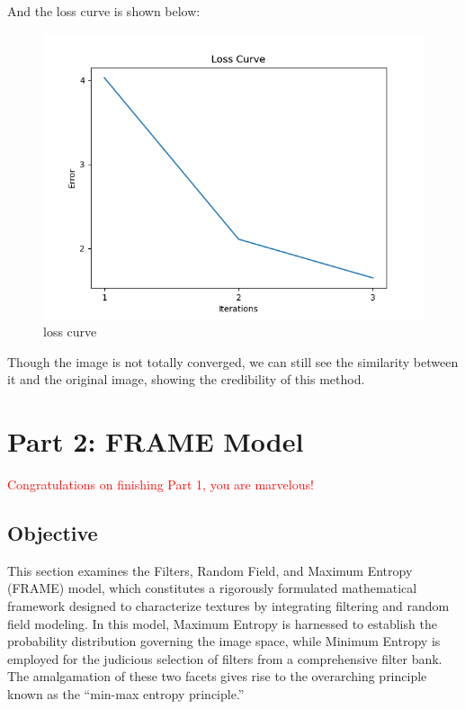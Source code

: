 \documentclass[11pt]{article}
\begin{document}
And the loss curve is shown below:
\begin{figure}[ht!]
    \centering
    \includegraphics[width=\linewidth]{figs_for_latex_only/loss_curve.png}
    \caption{loss curve}
\end{figure}

Though the image is not totally converged, we can still see the similarity between it and the original image, showing the credibility of this method.

\section{Part 2: FRAME Model}

\textcolor{red}{Congratulations on finishing Part 1, you are marvelous!}

\subsection{Objective}

This section examines the Filters, Random Field, and Maximum Entropy (FRAME) model, which constitutes a rigorously formulated mathematical framework designed to characterize textures by integrating filtering and random field modeling. In this model, Maximum Entropy is harnessed to establish the probability distribution governing the image space, while Minimum Entropy is employed for the judicious selection of filters from a comprehensive filter bank. The amalgamation of these two facets gives rise to the overarching principle known as the ``min-max entropy principle.''
\end{document}
